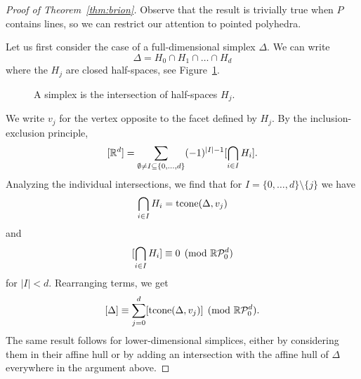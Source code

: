 \begin{proof}[Proof of Theorem~\ref{thm:brion}]
  Observe that the result is trivially true when $P$ contains lines,
  so we can restrict our attention to pointed polyhedra.

  Let us first consider the case of a full-dimensional simplex $\Delta$.
  We can write
  \[
    \Delta = H_0 \cap H_1 \cap \dots \cap H_d
  \]
  where the $H_j$ are closed half-spaces, see Figure~\ref{fig:brion-simplex}.
\begin{figure}
  \begin{center}
  \end{center}
  \caption{A simplex is the intersection of half-spaces $H_j$.}
  \label{fig:brion-simplex}
\end{figure}
  We write $v_j$ for the vertex opposite to the facet defined by $H_j$.
  By the inclusion-exclusion principle,
  \[
    [\mathbb{R}^d] = \sum_{\emptyset \neq I \subseteq \{0,\ldots,d\}} (-1)^{|I| - 1} [\bigcap_{i\in I} H_i].
  \]
  Analyzing the individual intersections,
  we find that for $I = \{0,\ldots,d\} \setminus \{ j \}$ we have
  \[
    \bigcap_{i \in I} H_i = \operatorname{tcone}(\Delta, v_j)
  \]
  and
  \[
    [\bigcap_{i \in I} H_i] \equiv 0 \pmod{\mathbb{R}\mathcal{P}_0^d}
  \]
  for $|I| < d$.
  Rearranging terms, we get
  \[
    [\Delta] \equiv \sum_{j=0}^{d} [\operatorname{tcone}(\Delta, v_j)] \pmod{\mathbb{R}\mathcal{P}_0^d}.
  \]
  The same result follows for lower-dimensional simplices,
  either by considering them in their affine hull or by adding an intersection with the affine hull of $\Delta$
  everywhere in the argument above.


\end{proof}
